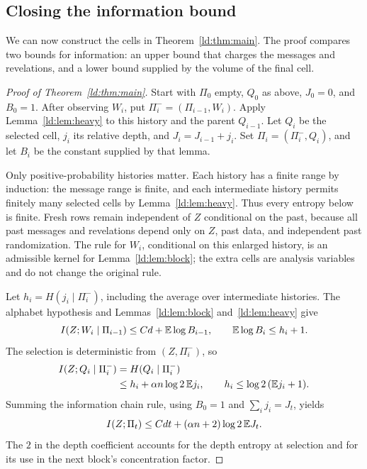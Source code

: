 \subsection{Closing the information bound}\label{ld:sec:iteration}

We can now construct the cells in Theorem~\ref{ld:thm:main}. The proof
compares two bounds for information: an upper bound that charges the
messages and revelations, and a lower bound supplied by the volume of
the final cell.

\begin{proof}[Proof of Theorem~\ref{ld:thm:main}]
Start with $\Pi_0$ empty, $Q_0$ as above, $J_0=0$, and $B_0=1$.
After observing $W_i$, put $\Pi_i^-=(\Pi_{i-1},W_i)$. Apply
Lemma~\ref{ld:lem:heavy} to this history and the parent $Q_{i-1}$.
Let $Q_i$ be the selected cell, $j_i$ its relative depth, and
$J_i=J_{i-1}+j_i$. Set $\Pi_i=(\Pi_i^-,Q_i)$, and let $B_i$
be the constant supplied by that lemma.

Only positive-probability histories matter. Each history has a finite
range by induction: the message range is finite, and each intermediate
history permits finitely many selected cells by Lemma~\ref{ld:lem:heavy}.
Thus every entropy below is finite. Fresh rows remain independent of
$Z$ conditional on the past, because all past messages and revelations
depend only on $Z$, past data, and independent past randomization.
The rule for $W_i$, conditional on this enlarged history, is an admissible
kernel for Lemma~\ref{ld:lem:block}; the extra cells are analysis variables
and do not change the original rule.

Let $h_i=H(j_i\mid\Pi_i^-)$, including the average over intermediate
histories. The alphabet hypothesis and Lemmas~\ref{ld:lem:block}
and~\ref{ld:lem:heavy} give
\[
 I(Z;W_i\mid\Pi_{i-1})\le Cd+\mathbb E\log B_{i-1},
 \qquad \mathbb E\log B_i\le h_i+1.
\]
The selection is deterministic from $(Z,\Pi_i^-)$, so
\begin{align*}
 I(Z;Q_i\mid\Pi_i^-)
 &=H(Q_i\mid\Pi_i^-)\\
 &\le h_i+\alpha n\log2\,\mathbb E j_i,
 \qquad h_i\le\log2\,(\mathbb E j_i+1).
\end{align*}
Summing the information chain rule, using $B_0=1$ and
$\sum_i j_i=J_t$, yields
\begin{equation}\label{ld:eq:depth-upper}
 I(Z;\Pi_t)\le Cdt+(\alpha n+2)\log2\,\mathbb E J_t.
\end{equation}
The $2$ in the depth coefficient accounts for the depth entropy at
selection and for its use in the next block's concentration factor.


\end{proof}

